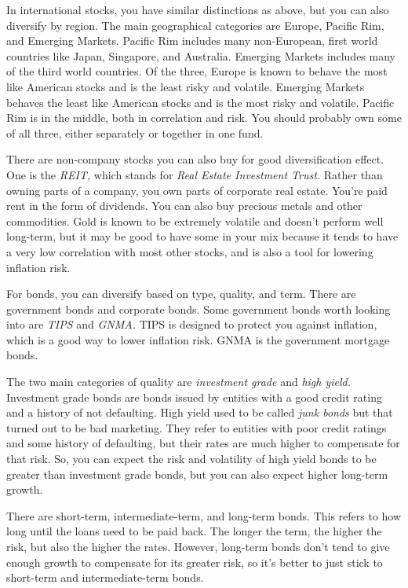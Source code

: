 In international stocks, you have similar distinctions as above, but you can also diversify by region. The main geographical categories are Europe, Pacific Rim, and Emerging Markets. Pacific Rim includes many non-European, first world countries like Japan, Singapore, and Australia. Emerging Markets includes many of the third world countries. Of the three, Europe is known to behave the most like American stocks and is the least risky and volatile. Emerging Markets behaves the least like American stocks and is the most risky and volatile. Pacific Rim is in the middle, both in correlation and risk. You should probably own some of all three, either separately or together in one fund.

There are non-company stocks you can also buy for good diversification effect. One is the \emph{REIT,} which stands for \emph{Real Estate Investment Trust.} Rather than owning parts of a company, you own parts of corporate real estate. You're paid rent in the form of dividends. You can also buy precious metals and other commodities. Gold is known to be extremely volatile and doesn't perform well long-term, but it may be good to have some in your mix because it tends to have a very low correlation with most other stocks, and is also a tool for lowering inflation risk.

For bonds, you can diversify based on type, quality, and term. There are government bonds and corporate bonds. Some government bonds worth looking into are \emph{TIPS} and \emph{GNMA.} TIPS is designed to protect you against inflation, which is a good way to lower inflation risk. GNMA is the government mortgage bonds.

The two main categories of quality are \emph{investment grade} and \emph{high yield.} Investment grade bonds are bonds issued by entities with a good credit rating and a history of not defaulting. High yield used to be called \emph{junk bonds} but that turned out to be bad marketing. They refer to entities with poor credit ratings and some history of defaulting, but their rates are much higher to compensate for that risk. So, you can expect the risk and volatility of high yield bonds to be greater than investment grade bonds, but you can also expect higher long-term growth.

There are short-term, intermediate-term, and long-term bonds. This refers to how long until the loans need to be paid back. The longer the term, the higher the risk, but also the higher the rates. However, long-term bonds don't tend to give enough growth to compensate for its greater risk, so it's better to just stick to short-term and intermediate-term bonds.

